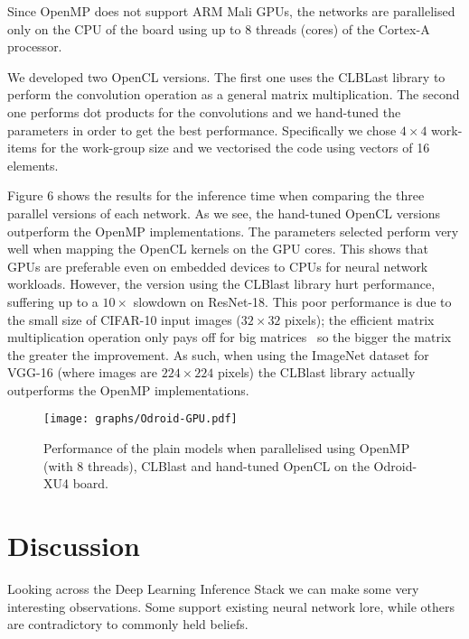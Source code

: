 \documentclass[conference]{IEEEtran}
\begin{document}
Since OpenMP does not support ARM Mali GPUs, the networks are parallelised only on the CPU of the board using up to 8 threads (cores) of the Cortex-A processor. 

We developed two OpenCL versions. The first one uses the CLBLast library to perform the convolution operation as a general matrix multiplication. The second one performs dot products for the convolutions and we hand-tuned the parameters in order to get the best performance. Specifically we chose $4 \times 4$ work-items for the work-group size and we vectorised the code using vectors of 16 elements.

Figure 6 shows the results for the inference time when comparing the three parallel versions of each network. As we see, the hand-tuned OpenCL versions outperform the OpenMP implementations. The parameters selected perform very well when mapping the OpenCL kernels on the GPU cores. This shows that GPUs are preferable even on embedded devices to CPUs for neural network workloads. However, the version using the CLBlast library hurt performance, suffering up to a $10\times$ slowdown on ResNet-18. This poor performance is due to the small size of CIFAR-10 input images ($32\times32$ pixels); the efficient matrix multiplication operation only pays off for big matrices~\cite{multiprog_2018} so the bigger the matrix the greater the improvement. As such, when using the ImageNet dataset for VGG-16 (where images are $224\times224$ pixels) the CLBlast library actually outperforms the OpenMP implementations.

\begin{figure}
\centering
\texttt{[image: graphs/Odroid-GPU.pdf]}
\label{fig:parallel}
\caption{Performance of the plain models when parallelised using OpenMP (with 8 threads), CLBlast and hand-tuned OpenCL on the Odroid-XU4 board.}
\end{figure}


\section{Discussion}\label{sec:discussion}

Looking across the Deep Learning Inference Stack we can make some very interesting observations. Some support existing neural network lore, while others are contradictory to commonly held beliefs.
\end{document}
